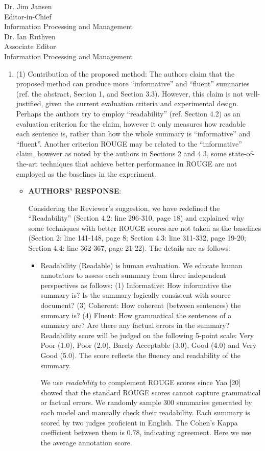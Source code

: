 \documentclass[11pt]{letter} %
\begin{document}
\begin{letter}{Dr. Jim Jansen \\
			Editor-in-Chief  \\
			Information Processing and Management\\
			Dr. Ian Ruthven \\
			Associate Editor \\
			Information Processing and Management}
		\flushleft
		\begin{enumerate}
		\textit{*The location labels in responses are the locations of revised manuscript.}
		    \item (1) Contribution of the proposed method: The authors claim that the proposed method can produce more ``informative'' and ``fluent'' summaries (ref. the abstract, Section 1, and Section 3.3). However, this claim is not well-justified, given the current evaluation criteria and experimental design. Perhaps the authors try to employ ``readability'' (ref. Section 4.2) as an evaluation criterion for the claim, however it only measures how readable each sentence is, rather than how the whole summary is ``informative'' and ``fluent''. Another criterion ROUGE may be related to the ``informative'' claim, however as noted by the authors in Sections 2 and 4.3, some state-of-the-art techniques that achieve better performance in ROUGE are not employed as the baselines in the experiment.

			\begin{itemize}
				\item[] \textbf{AUTHORS' RESPONSE}: 
				
				Considering the Reviewer's suggestion, 
				we have redefined the ``Readability'' (Section $4.2$: line 296-310, page $18$) 
				and explained why some techniques with better ROUGE scores are not taken 
				as the baselines (Section 2: line 141-148, page 8; Section 4.3: line 311-332, page 19-20;
				Section 4.4: line 362-367, page 21-22). The details are as follows: 
				\begin{itemize}
				\item Readability (Readable) is human evaluation. 
				We educate human annotators to assess each summary
				from three independent perspectives as follows: 
				(1) Informative: How informative the summary is? Is the summary logically consistent with source document? 
				(3) Coherent: How coherent (between sentences) the summary is? 
				(4) Fluent: How grammatical the sentences of a summary are? Are there any factual errors in the summary?
				Readability score will be judged on the following 5-point scale: Very Poor (1.0), Poor (2.0), Barely Acceptable (3.0), Good (4.0) and Very Good (5.0).
				The score reflects the fluency and readability of the summary.

                \hspace*{0.6cm} 
				We use \textit{readability} to complement ROUGE scores since Yao [20] showed that 
			    the standard ROUGE scores cannot capture grammatical or factual errors. 
				We randomly sample 300 summaries generated by each model and manually 
				check their readability. Each summary is scored by two judges proficient in English. 
                The Cohen's Kappa coefficient between them is $0.78$, indicating agreement. 
				Here we use the average annotation score.
                

\end{itemize}
\end{itemize}
\end{enumerate}
\end{letter}
\end{document}
